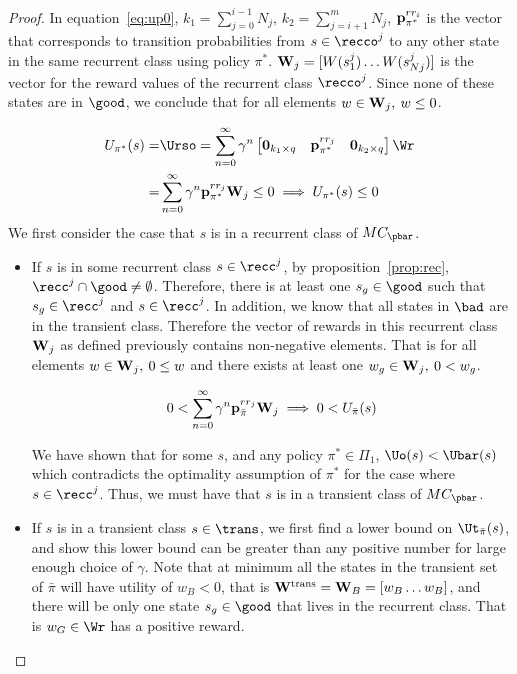 \begin{proof}
In equation~\eqref{eq:up0}, $k_1 = \sum_{j=0}^{i-1}N_j$, $k_2 = \sum_{j=i+1}^mN_j$, ${\bf p}^{rr_i}_{\pi^*}$ is the vector that corresponds to transition probabilities from $s \in \recco^j$ to any other state in the same recurrent class using policy $\pi^*$.  ${\bf W}_j = [W(s_1^j) \dotsc W(s_{Nj}^j)]$ is the vector for the reward values of the recurrent class $\recco^j$. Since none of these states are in $\good$, we conclude that for all elements $ w \in {\bf W}_j, \:w \leq 0$. 

\begin{align}
\label{eq:up0}
U_{\pi^*}(s) =& \Urso = \sum_{n=0}^\infty \gamma^n
\begin{bmatrix}
{\bf 0}_{k_1\times q} & {\bf p}_{\pi^*}^{rr_j}&{\bf 0}_{k_2\times q}
\end{bmatrix} \Wr \\
=&\sum_{n=0}^\infty \gamma^n {\bf p}_{\pi^*}^{rr_j} {\bf W}_j \leq 0 \implies U_{\pi^*}(s) \leq 0
\end{align}
We first consider the case that $s$ is in a recurrent class of $MC_{\pbar}$.
\begin{itemize}
\setlength{\leftmargin}{0pt}
\item If $s$ is in some recurrent class $s \in \recc^j$, by proposition~\ref{prop:rec}, $\recc^j \cap \good \neq \emptyset$. Therefore, there is at least one $s_g \in \good$ such that $s_g \in \recc^j$ and $s\in \recc^j$.
In addition, we know that all states in $\bad$ are in the transient class. Therefore the vector of rewards in this recurrent class ${\bf W}_j$ as defined previously contains non-negative elements. That is for all elements $w \in {\bf W}_j,\: 0 \leq w$ and there exists at least one $ w_g \in {\bf W}_j, \: 0<w_g$.

\begin{align}
\label{eq:upbar}
0<\sum_{n=0}^\infty \gamma^n {\bf p}^{rr_j}_{\bar{\pi}} {\bf W}_j 
 \implies 0 < U_{\bar{\pi}}(s)
\end{align}

We have shown that for some $s$, and any policy $\pi^* \in \Pi_1$, $\Uo(s) < \Ubar(s)$ which contradicts the optimality assumption of $\pi^*$ for the case where $s \in \recc^j$. Thus, we must have that $s$ is in a transient class of $MC_{\pbar}$. 


\item If $s$ is in a transient class $s\in \trans$, we first find a lower bound on $\Ut_{\bar{\pi}}(s)$, and show this lower bound can be greater than any positive number for large enough choice of $\gamma$. 
Note that at minimum all the states in the transient set of $\bar{\pi}$ will have utility of $w_B <0$, that is ${\bf W}^{\text{trans}} =  {\bf W}_B=[w_B \dotsc w_B]$, and there will be only one state $s_g \in \good$ that lives in the recurrent class. That is $w_G \in \Wr$ has a positive reward. 


\end{itemize}
\end{proof}

